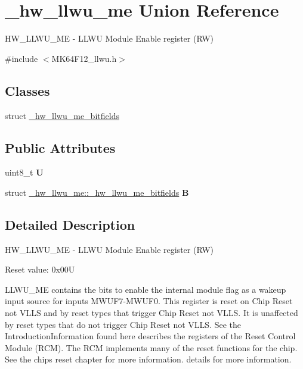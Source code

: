 \hypertarget{union__hw__llwu__me}{}\section{\+\_\+hw\+\_\+llwu\+\_\+me Union Reference}
\label{union__hw__llwu__me}


H\+W\+\_\+\+L\+L\+W\+U\+\_\+\+ME -\/ L\+L\+WU Module Enable register (RW)  




{\ttfamily \#include $<$M\+K64\+F12\+\_\+llwu.\+h$>$}

\subsection*{Classes}
\begin{DoxyCompactItemize}
\item 
struct \hyperlink{struct__hw__llwu__me_1_1__hw__llwu__me__bitfields}{\+\_\+hw\+\_\+llwu\+\_\+me\+\_\+bitfields}
\end{DoxyCompactItemize}
\subsection*{Public Attributes}
\begin{DoxyCompactItemize}
\item 
uint8\+\_\+t {\bfseries U}\hypertarget{union__hw__llwu__me_a15a12b91a746db15e526ae2b62d44c34}{}\label{union__hw__llwu__me_a15a12b91a746db15e526ae2b62d44c34}

\item 
struct \hyperlink{struct__hw__llwu__me_1_1__hw__llwu__me__bitfields}{\+\_\+hw\+\_\+llwu\+\_\+me\+::\+\_\+hw\+\_\+llwu\+\_\+me\+\_\+bitfields} {\bfseries B}\hypertarget{union__hw__llwu__me_a077c80205aebc3c932383eeb318815b1}{}\label{union__hw__llwu__me_a077c80205aebc3c932383eeb318815b1}

\end{DoxyCompactItemize}


\subsection{Detailed Description}
H\+W\+\_\+\+L\+L\+W\+U\+\_\+\+ME -\/ L\+L\+WU Module Enable register (RW) 

Reset value\+: 0x00U

L\+L\+W\+U\+\_\+\+ME contains the bits to enable the internal module flag as a wakeup input source for inputs M\+W\+U\+F7-\/\+M\+W\+U\+F0. This register is reset on Chip Reset not V\+L\+LS and by reset types that trigger Chip Reset not V\+L\+LS. It is unaffected by reset types that do not trigger Chip Reset not V\+L\+LS. See the Introduction\+Information found here describes the registers of the Reset Control Module (R\+CM). The R\+CM implements many of the reset functions for the chip. See the chip\textquotesingle{}s reset chapter for more information. details for more information. 

